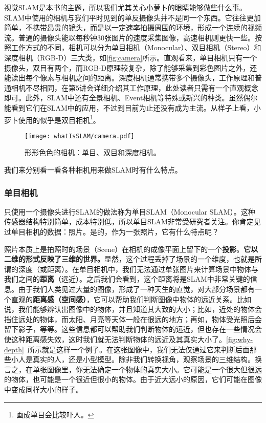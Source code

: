 视觉SLAM是本书的主题，所以我们尤其关心小萝卜的眼睛能够做些什么事。SLAM中使用的相机与我们平时见到的单反摄像头并不是同一个东西。它往往更加简单，不携带昂贵的镜头，而是以一定速率拍摄周围的环境，形成一个连续的视频流。普通的摄像头能以每秒钟30张图片的速度采集图像，高速相机则更快一些。按照工作方式的不同，相机可以分为单目相机（Monocular）、双目相机（Stereo）和深度相机（RGB-D）三大类，如\autoref{fig:camera}所示。直观看来，单目相机只有一个摄像头，双目有两个，而RGB-D原理较复杂，除了能够采集到彩色图片之外，还能读出每个像素与相机之间的距离。深度相机通常携带多个摄像头，工作原理和普通相机不尽相同，在第5讲会详细介绍其工作原理，此处读者只需有一个直观概念即可。此外，SLAM中还有全景相机\textsuperscript{\cite{Pretto2011}}、Event相机\textsuperscript{\cite{Rueckauer2016}}等特殊或新兴的种类。虽然偶尔能看到它们在SLAM中的应用，不过到目前为止还没有成为主流。从样子上看，小萝卜使用的似乎是双目相机\footnote{画成单目会比较吓人。}。

\begin{figure}[!ht]
	\centering
	\texttt{[image: whatIsSLAM/camera.pdf]}
	\caption{形形色色的相机：单目、双目和深度相机。}
	\label{fig:camera}
\end{figure}

我们来分别看一看各种相机用来做SLAM时有什么特点。

\subsubsection{单目相机}
只使用一个摄像头进行SLAM的做法称为单目SLAM（Monocular SLAM）。这种传感器结构特别简单，成本特别低，所以单目SLAM非常受研究者关注。你肯定见过单目相机的数据：照片。是的，作为一张照片，它有什么特点呢？

照片本质上是拍照时的场景（Scene）在相机的成像平面上留下的一个\textbf{投影}。\textbf{它以二维的形式反映了三维的世界。}显然，这个过程丢掉了场景的一个维度，也就是所谓的深度（或距离）。在单目相机中，我们无法通过单张图片来计算场景中物体与我们之间的\textbf{距离}（远近）。之后我们会看到，这个距离将是SLAM中非常关键的信息。由于我们人类见过大量的图像，形成了一种天生的直觉，对大部分场景都有一个直观的\textbf{距离感（空间感）}，它可以帮助我们判断图像中物体的远近关系。比如说，我们能够辨认出图像中的物体，并且知道其大致的大小；比如，近处的物体会挡住远处的物体，而太阳、月亮等天体一般在很远的地方；再如，物体受光照后会留下影子，等等。这些信息都可以帮助我们判断物体的远近，但也存在一些情况会使这种距离感失效，这时我们就无法判断物体的远近及其真实大小了。\autoref{fig:why-depth}~所示就是这样一个例子。在这张图像中，我们无法仅通过它来判断后面那些小人是真实的人，还是小型模型。除非我们转换视角，观察场景的三维结构。换言之，在单张图像里，你无法确定一个物体的真实大小。它可能是一个很大但很远的物体，也可能是一个很近但很小的物体。由于近大远小的原因，它们可能在图像中变成同样大小的样子。

